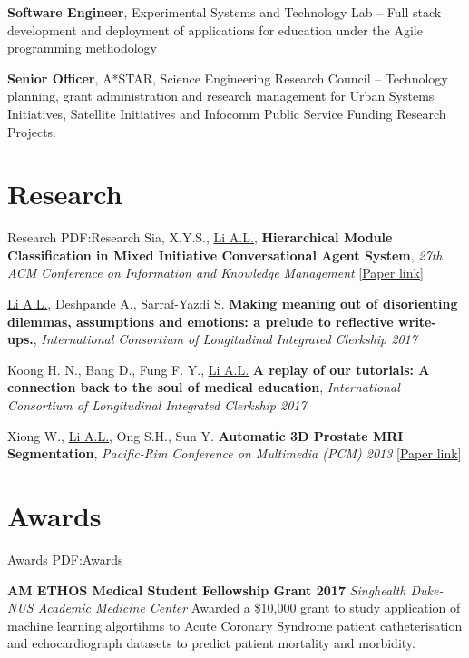 \documentclass[letterpaper,10pt,oneside]{article}
\begin{document}
\begin{body}
{\textbf{Software Engineer}, Experimental Systems and Technology Lab}
\hfill
{} --
\BulletItem
Full stack development and deployment of applications for education under the Agile programming methodology

{\textbf{Senior Officer}, A*STAR, Science Engineering Research Council}
\hfill
{} --
\BulletItem
Technology planning, grant administration and research management for Urban Systems Initiatives, Satellite Initiatives and Infocomm Public Service Funding Research Projects.

\section
{Research}
{Research}
{PDF:Research}
Sia, X.Y.S., \underline{Li A.L.}, \textbf{Hierarchical Module Classification in Mixed Initiative Conversational Agent System}, \textit{27th ACM Conference on Information and Knowledge Management} [\href{https://drive.google.com/open?id=1clB78gu3vBMSKxoMK5wMHaWoWPxYcgkf}{Paper link}]
\hfill
{}
\GapNoBreak

\underline{Li A.L.}, Deshpande A., Sarraf-Yazdi S. \textbf{Making meaning out of disorienting dilemmas, assumptions and emotions: a prelude to reflective write-ups.}, \textit{International Consortium of Longitudinal Integrated Clerkship 2017}
\hfill
{}
\GapNoBreak

Koong H. N., Bang D., Fung F. Y., \underline{Li A.L.} \textbf{A replay of our tutorials: A connection back to the soul of medical education}, \textit{International Consortium of Longitudinal Integrated Clerkship 2017}
\hfill
{}
\GapNoBreak

Xiong W., \underline{Li A.L.}, Ong S.H., Sun Y. \textbf{Automatic 3D Prostate MRI Segmentation}, \textit{Pacific-Rim Conference on Multimedia (PCM) 2013}
[\href{https://link.springer.com/chapter/10.1007\%2F978-3-319-03731-8_20}{Paper link}]
\hfill
{}
\GapNoBreak

\section
{Awards}
{Awards}
{PDF:Awards}

\textbf{AM ETHOS Medical Student Fellowship Grant 2017}
\hfill{}
\GapNoBreak
\textit{Singhealth Duke-NUS Academic Medicine Center}
\GapNoBreak
\BulletItem
Awarded a \$10,000 grant to study application of machine learning algortihms to Acute Coronary Syndrome patient catheterisation and echocardiograph datasets to predict patient mortality and morbidity.
\GapNoBreak


\end{body}
\end{document}
